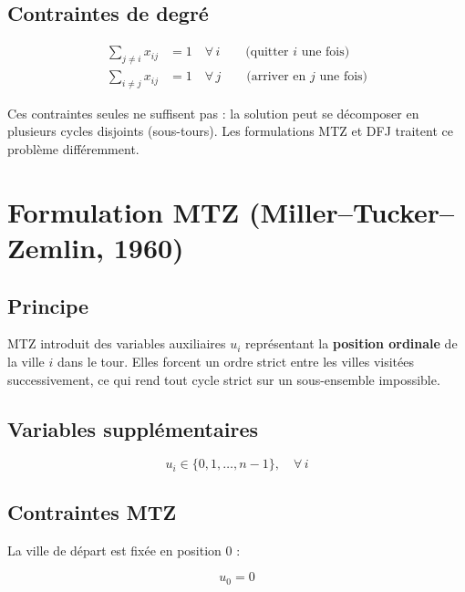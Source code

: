 \documentclass[12pt, a4paper]{article}
\begin{document}
\subsection{Contraintes de degré}

\begin{align}
  \sum_{j \neq i} x_{ij} &= 1 \quad \forall\, i \qquad \text{(quitter } i \text{ une fois)} \\
  \sum_{i \neq j} x_{ij} &= 1 \quad \forall\, j \qquad \text{(arriver en } j \text{ une fois)}
\end{align}

Ces contraintes seules ne suffisent pas : la solution peut se décomposer en plusieurs
cycles disjoints (sous-tours). Les formulations MTZ et DFJ traitent ce problème
différemment.

\section{Formulation MTZ (Miller--Tucker--Zemlin, 1960)}

\subsection{Principe}

MTZ introduit des variables auxiliaires $u_i$ représentant la
\textbf{position ordinale} de la ville $i$ dans le tour.
Elles forcent un ordre strict entre les villes visitées successivement,
ce qui rend tout cycle strict sur un sous-ensemble impossible.

\subsection{Variables supplémentaires}

\begin{equation}
  u_i \in \{0, 1, \ldots, n-1\}, \quad \forall\, i
\end{equation}

\subsection{Contraintes MTZ}

La ville de départ est fixée en position $0$ :

\begin{equation}
  u_0 = 0
\end{equation}
\end{document}
